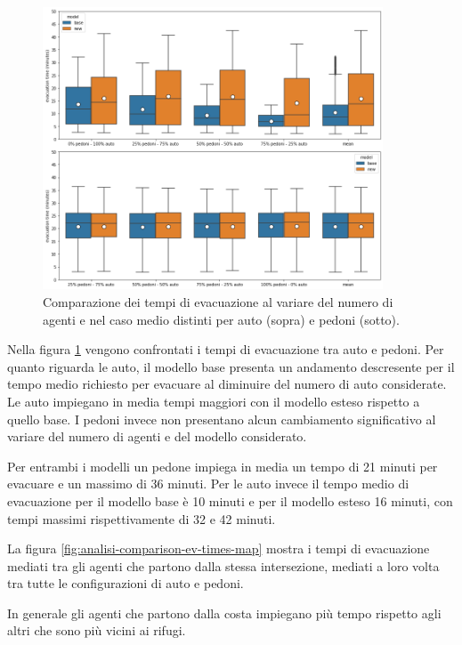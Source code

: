 \begin{figure}[ht]
    \centering
    \includegraphics[width=0.9\textwidth]{images/analisi/comparison-evtimes2.png}
    \caption{
        Comparazione dei tempi di evacuazione al variare del numero di agenti e nel caso medio distinti per auto (sopra) e pedoni (sotto).
    }
    \label{fig:analisi-comparison-evtimes2}
\end{figure}

Nella figura \ref{fig:analisi-comparison-evtimes2} vengono confrontati i tempi di evacuazione tra auto e pedoni.
Per quanto riguarda le auto, il modello base presenta un andamento descresente per il tempo medio richiesto per evacuare al diminuire del numero di auto considerate.
Le auto impiegano in media tempi maggiori con il modello esteso rispetto a quello base.
%
I pedoni invece non presentano alcun cambiamento significativo al variare del numero di agenti e del modello considerato. 

Per entrambi i modelli un pedone impiega in media un tempo di 21 minuti per evacuare e un massimo di 36 minuti.
Per le auto invece il tempo medio di evacuazione per il modello base è 10 minuti e per il modello esteso 16 minuti, 
con tempi massimi rispettivamente di 32 e 42 minuti.

La figura \ref{fig:analisi-comparison-ev-times-map} mostra i tempi di evacuazione mediati tra gli agenti che partono dalla stessa intersezione,
mediati a loro volta tra tutte le configurazioni di auto e pedoni.

In generale gli agenti che partono dalla costa impiegano più tempo rispetto agli altri che sono più vicini ai rifugi.

